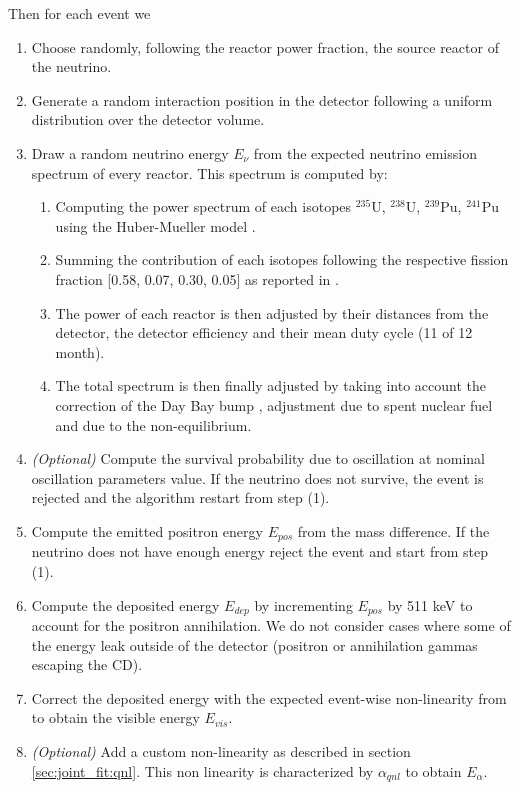 \documentclass[../main.tex]{subfiles}
\begin{document}
Then for each event we
\begin{enumerate}
  \item Choose randomly, following the reactor power fraction, the source reactor of the neutrino.
  \item Generate a random interaction position in the detector following a uniform distribution over the detector volume.
  \item Draw a random neutrino energy $E_{\nu}$ from the expected neutrino emission spectrum of every reactor. This spectrum is computed by:
    \begin{enumerate}
      \item Computing the power spectrum of each isotopes $^{235}$U, $^{238}$U, $^{239}$Pu, $^{241}$Pu using the Huber-Mueller model \cite{huber_determination_2011, mueller_improved_2011}.
      \item Summing the contribution of each isotopes following the respective fission fraction [0.58, 0.07, 0.30, 0.05] as reported in \cite{ma_improved_2013}.
      \item The power of each reactor is then adjusted by their distances from the detector, the detector efficiency and their mean duty cycle (11 of 12 month).
      \item The total spectrum is then finally adjusted by taking into account the correction of the Day Bay bump \cite{daya_bay_collaboration_measurement_2016}, adjustment due to spent nuclear fuel and due to the non-equilibrium.
    \end{enumerate}
  \item \textit{(Optional)} Compute the survival probability due to oscillation at nominal oscillation parameters value. If the neutrino does not survive, the event is rejected and the algorithm restart from step (1).
  \item Compute the emitted positron energy $E_{pos}$ from the mass difference. If the neutrino does not have enough energy reject the event and start from step (1).
  \item Compute the deposited energy $E_{dep}$ by incrementing $E_{pos}$ by 511 keV to account for the positron annihilation. We do not consider cases where some of the energy leak outside of the detector (positron or annihilation gammas escaping the CD).
  \item Correct the deposited energy with the expected event-wise non-linearity from \cite{juno_collaboration_calibration_2021} to obtain the visible energy $E_{vis}$.
  \item \textit{(Optional)} Add a custom non-linearity as described in section \ref{sec:joint_fit:qnl}. This non linearity is characterized by $\alpha_{qnl}$ to obtain $E_{\alpha}$.

\end{enumerate}
\end{document}
